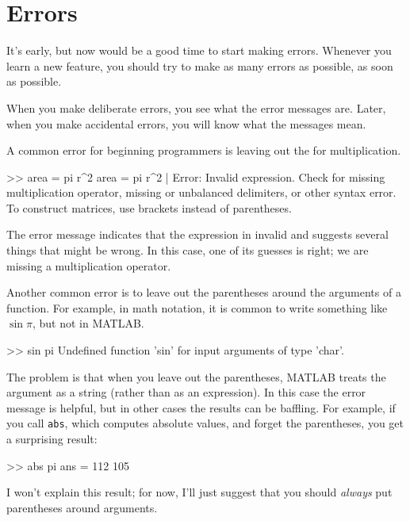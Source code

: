 \documentclass[
]{book}
\numberwithin{Answer}{chapter}
\numberwithin{Exercise}{chapter}
\begin{document}
\section{Errors}


It's early, but now would be a good time to start making errors.
Whenever you learn a new feature, you should try to make as many errors as possible, as soon as possible.

When you make deliberate errors, you see what the error messages are.
Later, when you make accidental errors, you will know what the messages mean.

A common error for beginning programmers is leaving out the {\tt *}
for multiplication.

\begin{code}
>> area = pi r^2
 area = pi r^2
           |
Error: Invalid expression. Check for missing multiplication operator, 
missing or unbalanced delimiters, or other syntax error.
To construct matrices, use brackets instead of parentheses.
\end{code}


The error message indicates that the expression in invalid and suggests several things that might be wrong.  In this case, one of its guesses is right; we are missing a multiplication operator.


Another common error is to leave out the parentheses around the
arguments of a function.  For example, in math notation, it is common
to write something like $\sin \pi$, but not in MATLAB.

\begin{code}
>> sin pi
Undefined function 'sin' for input arguments of type 'char'.
\end{code}

The problem is that when you leave out the parentheses, MATLAB treats
the argument as a string (rather than as an expression).
In this case the error message is helpful, but in other cases the results can be baffling.
For example, if you call {\tt abs}, which computes absolute values, and forget the parentheses, you get a surprising result:

\begin{code}
>> abs pi
ans =  112   105
\end{code}

I won't explain this result; for now, I'll just suggest that you should {\em always} put parentheses around arguments.
\end{document}
